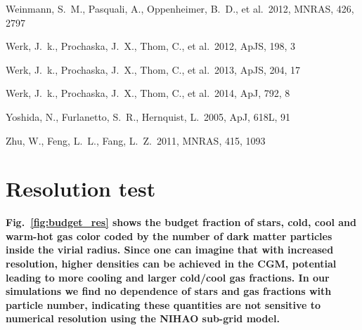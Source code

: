 \documentclass[useAMS,usenatbib]{mn2e}
\def \apj {ApJ}
\def \mnras {MNRAS}
\def \apjs {ApJS}
\begin{document}
\begin{thebibliography}{}
   Weinmann, S.~M., Pasquali, A., Oppenheimer, B.~D., et al.\ 2012, \mnras, 426, 2797 

 Werk, J.~k., Prochaska, J.~X., Thom, C., et al.\ 2012, \apjs, 198, 3

 Werk, J.~k., Prochaska, J.~X., Thom, C., et al.\ 2013, \apjs, 204, 17

 Werk, J.~k., Prochaska, J.~X., Thom, C., et al.\ 2014, \apj, 792, 8



Yoshida, N., Furlanetto, S.~R., Hernquist, L.\ 2005, \apj, 618L, 91


 Zhu, W., Feng, L.~L., Fang, L.~Z.\ 2011, \mnras, 415, 1093

\end{thebibliography}


\appendix

\section{Resolution test}

{\bf Fig.~\ref{fig:budget_res} shows the budget fraction of stars, cold, cool
  and warm-hot gas color coded by the number of dark matter particles
  inside the virial radius. Since one can imagine that with increased
  resolution, higher densities can be achieved in the CGM, potential
  leading to more cooling and larger cold/cool gas fractions.  In our
  simulations we find no dependence of stars and gas fractions with particle
  number, indicating these quantities are not sensitive to numerical
  resolution using the NIHAO sub-grid model.}


\begin{figure*}
\centerline{
}
\caption{Baryon content of NIHAO simulations as a function of
    halo mass color coded by number of dark matter particles per
    halo. This shows the stars and gas content of the simulations is
    insensitive to order of magnitude changes in particle
    resolution.}
\label{fig:budget_res}
\end{figure*}


\label{lastpage}
\end{document}
